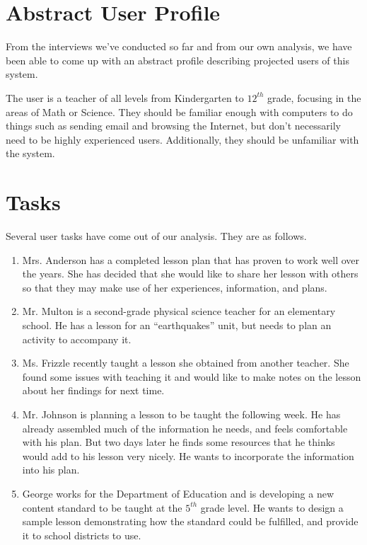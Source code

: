 \documentclass[12pt,titlepage]{article}
\begin{document}
\section{Abstract User Profile}
From the interviews we've conducted so far and from our own analysis, we have
been able to come up with an abstract profile describing projected users of this
system.

The user is a teacher of all levels from Kindergarten to $12^{th}$ grade, focusing
in the areas of Math or Science.  They should be familiar enough with computers to
do things such as sending email and browsing the Internet, but don't necessarily need
to be highly experienced users.  Additionally, they should be unfamiliar with the
system.

\section{Tasks}
Several user tasks have come out of our analysis.  They are as follows.

\begin{enumerate}
\item Mrs. Anderson has a completed lesson plan that has proven to work well over
      the years.  She has decided that she would like to share her lesson with
      others so that they may make use of her experiences, information, and
      plans.

\item Mr. Multon is a second-grade physical science teacher for an elementary school.
      He has a lesson for an ``earthquakes'' unit, but needs to plan an activity
      to accompany it.

\item Ms. Frizzle recently taught a lesson she obtained from another teacher.  She
      found some issues with teaching it and would like to make notes on the lesson
      about her findings for next time.

\item Mr. Johnson is planning a lesson to be taught the following week.  He has
      already assembled much of the information he needs, and feels comfortable
      with his plan.  But two days later he finds some resources that he thinks
      would add to his lesson very nicely.  He wants to incorporate the information
      into his plan.

\item George works for the Department of Education and is developing a new content
      standard to be taught at the $5^{th}$ grade level.  He wants to design a
      sample lesson demonstrating how the standard could be fulfilled, and provide
      it to school districts to use.
\end{enumerate}
\end{document}
